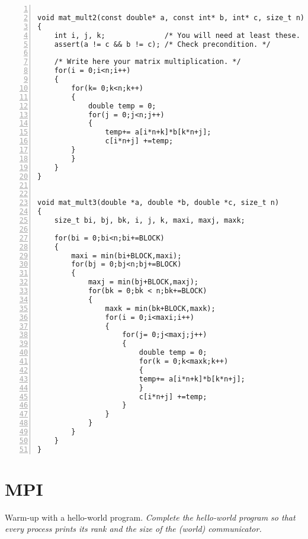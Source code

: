 \documentclass{article}
\begin{document}
\begin{lstlisting}[basicstyle=\small\sffamily,
keywords={break,case,const,continue,default,else,enum,
for,if,return,switch,while,do,long,void,int,float,double,
char,struct,typedef,include,size\_t},
keywordstyle={\color{blue}},
comment={[l]{//}}, morecomment={[s]{/*}{*/}}, commentstyle=\itshape,
columns={[l]flexible}, numbers=left, numberstyle=\tiny,
frameround=fftt, frame=shadowbox, captionpos=b,
caption={Your OpenMP implementation.},
label=LST:openmp]

void mat_mult2(const double* a, const int* b, int* c, size_t n)
{
    int i, j, k;              /* You will need at least these. */
    assert(a != c && b != c); /* Check precondition. */

    /* Write here your matrix multiplication. */
    for(i = 0;i<n;i++)
    {
        for(k= 0;k<n;k++)
        {
            double temp = 0;
            for(j = 0;j<n;j++)
            {
                temp+= a[i*n+k]*b[k*n+j];
                c[i*n+j] +=temp;
	    }
	    }
	}
}


void mat_mult3(double *a, double *b, double *c, size_t n)
{
    size_t bi, bj, bk, i, j, k, maxi, maxj, maxk;

    for(bi = 0;bi<n;bi+=BLOCK)
    {
        maxi = min(bi+BLOCK,maxi);
        for(bj = 0;bj<n;bj+=BLOCK)
        {
            maxj = min(bj+BLOCK,maxj);
            for(bk = 0;bk < n;bk+=BLOCK)
            {
                maxk = min(bk+BLOCK,maxk);
                for(i = 0;i<maxi;i++)
                {
                    for(j= 0;j<maxj;j++)
                    {
                        double temp = 0;
                        for(k = 0;k<maxk;k++)
                        {
                        temp+= a[i*n+k]*b[k*n+j];
                        }
                        c[i*n+j] +=temp;
                    }
                }
            }
        }
    }
}
\end{lstlisting}

\section{MPI}

\begin{ExerciseList}
\Exercise Warm-up with a hello-world program.
\Question \emph{Complete the hello-world program so that every process
  prints its rank and the size of the (world) communicator.}
\end{ExerciseList}
\end{document}

